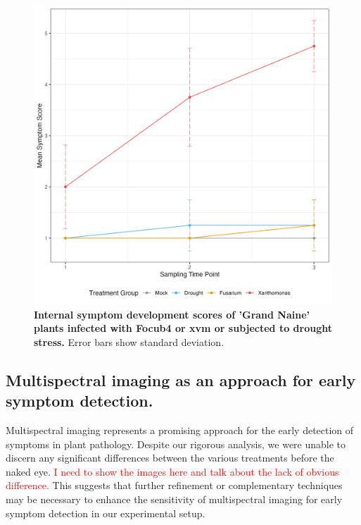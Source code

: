 \begin{figure}[h!]
    \centering
    \includegraphics[width=\textwidth]{Figures/Internal_plot.png}
    \captionsetup{width=\textwidth}
    \caption[Internal symptom development scores of 'Grand Naine' plants infected with \acl{Focub4} or \acl{xvm} or subjected to drought stress]{\textbf{Internal symptom development scores of 'Grand Naine' plants infected with \acf{Focub4} or \acf{xvm} or subjected to drought stress.} Error bars show standard deviation.}
    \label{fig:InternalSymptoms}
\end{figure}

\subsection{Multispectral imaging as an approach for early symptom detection.}

Multispectral imaging represents a promising approach for the early detection of symptoms in plant pathology. Despite our rigorous analysis, we were unable to discern any significant differences between the various treatments before the naked eye.  \textcolor{red}{I need to show the images here and talk about the lack of obvious difference.} This suggests that further refinement or complementary techniques may be necessary to enhance the sensitivity of multispectral imaging for early symptom detection in our experimental setup. 

